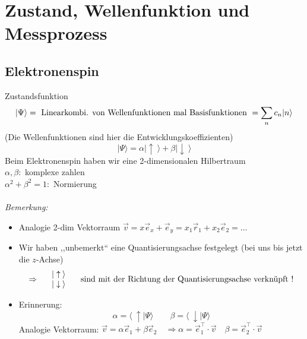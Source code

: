 \section{Zustand, Wellenfunktion und Messprozess}

\subsection{Elektronenspin}

Zustandsfunktion
\begin{equation*}
|\Psi\rangle = \textrm{ Linearkombi. von Wellenfunktionen mal Basisfunktionen } = \sum_n c_n |n\rangle
\end{equation*}
(Die Wellenfunktionen sind hier die Entwicklungskoeffizienten)
\begin{equation*}
|\Psi \rangle = \alpha |\uparrow \: \rangle + \beta |\downarrow \: \rangle
\end{equation*}
Beim Elektronenspin haben wir eine 2-dimensionalen Hilbertraum \mau\\[5pt]
$ \alpha, \beta : $ komplexe zahlen\\
$ \alpha^2 + \beta^2 = 1 : $ Normierung\\[5pt]
\\[5pt]
\emph{Bemerkung:}
\begin{itemize}
	\item Analogie 2-dim Vektorraum $ \vec{v} = x \vec{e}_x +  \vec{e}_y = x_1 \vec{r}_1 + x_2 \vec{e}_2 = \dots $
	\item Wir haben ,,unbemerkt`` eine Quantisierungsachse festgelegt (bei uns bis jetzt die $ z $-Achse)\\
	\begin{equation*}
	\Rightarrow \quad \begin{array}{l}
	| \uparrow \: \rangle \\ | \downarrow \: \rangle
	\end{array} \quad \textrm{ sind mit der Richtung der Quantisierungsachse verknüpft !}
	\end{equation*}
	\item  Erinnerung:
	\begin{equation*}
	\alpha = \langle \: \uparrow | \Psi \rangle \qquad \beta = \langle \: \downarrow | \Psi \rangle
	\end{equation*}
	Analogie Vektorraum: $ \vec{v} = \alpha \vec{e}_1 + \beta \vec{e}_2 \quad \Rightarrow \alpha = \vec{e}_1^\top \cdot \vec{v} \quad \beta = \vec{e}_2^\top \cdot \vec{v} $ 
\end{itemize}
